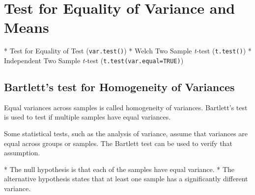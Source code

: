 



\section{Test for Equality of Variance and Means}

\begin{itemize}
* Test for Equality of Test (\texttt{var.test()})
* Welch Two Sample \emph{t-}test (\texttt{t.test()})
* Independent Two Sample \emph{t-}test (\texttt{t.test(var.equal=TRUE)})

\end{itemize}

\subsection{Bartlett's test for Homogeneity of Variances}
 

Equal variances across samples is called homogeneity of variances. Bartlett's test is used to test if multiple samples have equal variances. 

Some statistical tests, such as the analysis of variance, assume that variances are equal across groups or samples.  The Bartlett test can be used to verify that assumption.

\begin{itemize}
* The null hypothesis is that each of the samples have equal variance.
* The alternative hypothesis states that at least one sample has a significantly different variance.
\end{itemize}




